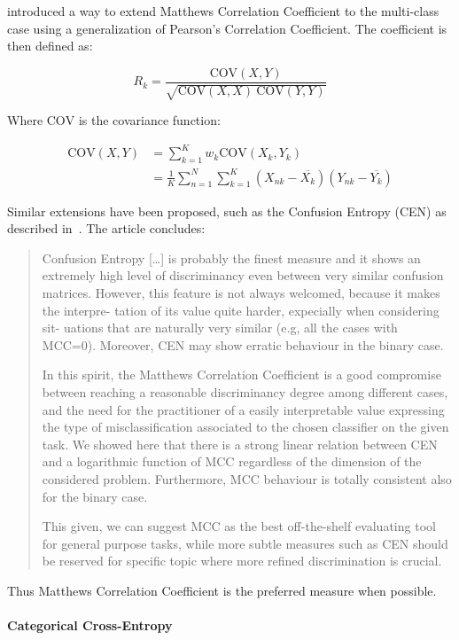 \cite{Gorodkin:2004aa} introduced a way to extend Matthews Correlation Coefficient to the multi-class case using a generalization of Pearson’s Correlation Coefficient. The coefficient is then defined as:

\begin{equation}
  R_k  = \frac{\text{COV}(X, Y)}{\sqrt{\text{COV}(X, X) \ \text{COV}(Y, Y)}}
\end{equation}

Where $\text{COV}$ is the covariance function:

\begin{align}
  \text{COV}(X, Y) &= \sum_{k=1}^K w_k \text{COV}(X_k, Y_k) \\
  &= \frac{1}{K} \sum_{n=1}^N \sum_{k=1}^K (X_{nk} - \overline{X_k})(Y_{nk} - \overline{Y_k})
\end{align}

Similar extensions have been proposed, such as the Confusion Entropy (CEN) as described in~\cite{Jurman:2012aa}. The article concludes:

\blockquote{Confusion Entropy [\ldots] is probably the finest measure and it shows an extremely high level of discriminancy even between very similar confusion matrices. However, this feature is not always welcomed, because it makes the interpre- tation of its value quite harder, expecially when considering sit- uations that are naturally very similar (e.g, all the cases with MCC=0). Moreover, CEN may show erratic behaviour in the binary case.

In this spirit, the Matthews Correlation Coefficient is a good compromise between reaching a reasonable discriminancy degree among different cases, and the need for the practitioner of a easily interpretable value expressing the type of misclassification associated to the chosen classifier on the given task. We showed here that there is a strong linear relation between CEN and a logarithmic function of MCC regardless of the dimension of the considered problem. Furthermore, MCC behaviour is totally consistent also for the binary case.

This given, we can suggest MCC as the best off-the-shelf evaluating tool for general purpose tasks, while more subtle measures such as CEN should be reserved for specific topic where more refined discrimination is crucial.}

Thus Matthews Correlation Coefficient is the preferred measure when possible.


\paragraph{Categorical Cross-Entropy}
\label{par:Categorical Cross-Entropy}

